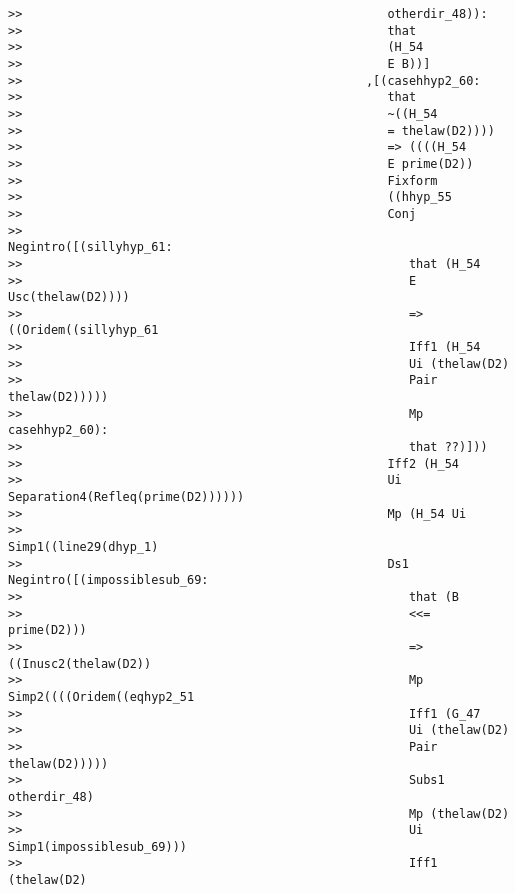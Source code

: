 \documentclass[12pt]{article}
\begin{document}
\begin{verbatim}
>>                                                   otherdir_48)):
>>                                                   that
>>                                                   (H_54
>>                                                   E B))]
>>                                                ,[(casehhyp2_60:
>>                                                   that
>>                                                   ~((H_54
>>                                                   = thelaw(D2))))
>>                                                   => ((((H_54
>>                                                   E prime(D2))
>>                                                   Fixform
>>                                                   ((hhyp_55
>>                                                   Conj
>>                                                   Negintro([(sillyhyp_61:
>>                                                      that (H_54
>>                                                      E Usc(thelaw(D2))))
>>                                                      => ((Oridem((sillyhyp_61
>>                                                      Iff1 (H_54
>>                                                      Ui (thelaw(D2)
>>                                                      Pair thelaw(D2)))))
>>                                                      Mp casehhyp2_60):
>>                                                      that ??)]))
>>                                                   Iff2 (H_54
>>                                                   Ui Separation4(Refleq(prime(D2))))))
>>                                                   Mp (H_54 Ui
>>                                                   Simp1((line29(dhyp_1)
>>                                                   Ds1 Negintro([(impossiblesub_69:
>>                                                      that (B
>>                                                      <<= prime(D2)))
>>                                                      => ((Inusc2(thelaw(D2))
>>                                                      Mp Simp2((((Oridem((eqhyp2_51
>>                                                      Iff1 (G_47
>>                                                      Ui (thelaw(D2)
>>                                                      Pair thelaw(D2)))))
>>                                                      Subs1 otherdir_48)
>>                                                      Mp (thelaw(D2)
>>                                                      Ui Simp1(impossiblesub_69)))
>>                                                      Iff1 (thelaw(D2)

\end{verbatim}
\end{document}
